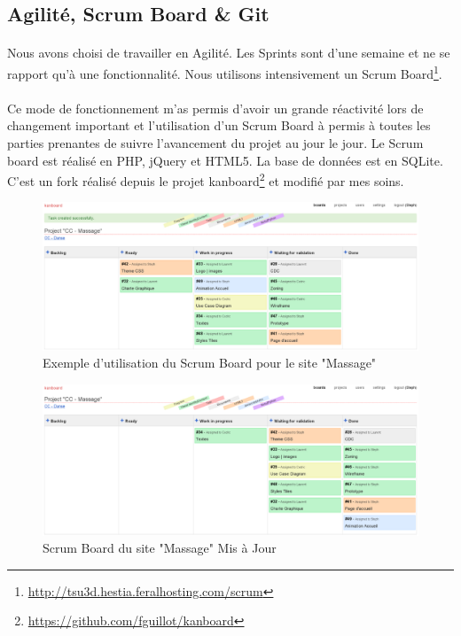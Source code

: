 \documentclass[11pt,a4paper]{report}
\begin{document}
		\subsection{Agilité, Scrum Board \& Git}
			\paragraph*{}Nous avons choisi de travailler en Agilité. Les Sprints sont d'une semaine et ne se rapport qu'à une fonctionnalité. Nous utilisons intensivement un Scrum Board\footnote{\url{http://tsu3d.hestia.feralhosting.com/scrum}}.
			\paragraph*{}Ce mode de fonctionnement m'as permis d'avoir un grande réactivité lors de changement important et l'utilisation d'un Scrum Board à permis à toutes les parties prenantes de suivre l'avancement du projet au jour le jour.
			Le Scrum board est réalisé en PHP, jQuery et HTML5. La base de données est en SQLite. C'est un fork réalisé depuis le projet kanboard\footnote{\url{https://github.com/fguillot/kanboard}} et modifié par mes soins.
			\begin{figure}[H]
				\centering
				\includegraphics[width=\textwidth]{kanban1.eps}
				\caption[Kanban Board]{Exemple d'utilisation du Scrum Board pour le site "Massage"}
				\label{fig:Kanban Board}
			\end{figure}
			\newpage
			\begin{figure}[H]
				\centering
				\includegraphics[width=\textwidth]{kanban2.eps}
				\caption[Kanban Board]{Scrum Board du site "Massage" Mis à Jour}
				\label{fig:Kanban Board v2}
			\end{figure}
\end{document}
